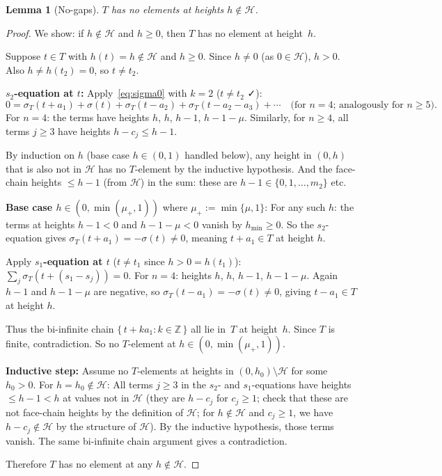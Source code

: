 \documentclass{article}
\newtheorem{lemma}{Lemma}
\begin{document}
\begin{lemma}[No-gaps]\label{lem:nogaps}
$T$ has no elements at heights $h\notin\mathcal{H}$.
\end{lemma}
\begin{proof}
We show: if $h\notin\mathcal{H}$ and $h\ge 0$, then $T$ has no element at height~$h$.

Suppose $t\in T$ with $h(t)=h\notin\mathcal{H}$ and $h\ge 0$.
Since $h\ne 0$ (as $0\in\mathcal{H}$), $h>0$.  Also $h\ne h(t_2)=0$, so $t\ne t_2$.

\textbf{$s_2$-equation at $t$:}
Apply~\eqref{eq:sigma0} with $k=2$ ($t\ne t_2$ ✓):
\[
  0=\sigma_T(t+a_1)+\sigma(t)+\sigma_T(t-a_2)+\sigma_T(t-a_2-a_3)+\cdots
  \quad\text{(for }n=4\text{; analogously for }n\ge 5).
\]
For $n=4$: the terms have heights $h$, $h$, $h-1$, $h-1-\mu$.
Similarly, for $n\ge 4$, all terms $j\ge 3$ have heights $h-c_j\le h-1$.

By induction on $h$ (base case $h\in(0,1)$ handled below), any height in
$(0,h)$ that is also not in $\mathcal{H}$ has no $T$-element by the inductive hypothesis.
And the face-chain heights $\le h-1$ (from $\mathcal{H}$) in the sum: these are
$h-1\in\{0,1,\dots,m_2\}$ etc.

\textbf{Base case $h\in(0,\min(\mu_+,1))$} where $\mu_+:=\min\{\mu,1\}$:
For any such $h$: the terms at heights $h-1<0$ and $h-1-\mu<0$ vanish by
$h_{\min}\ge 0$.  So the $s_2$-equation gives $\sigma_T(t+a_1)=-\sigma(t)\ne 0$,
meaning $t+a_1\in T$ at height $h$.

Apply \textbf{$s_1$-equation at $t$} ($t\ne t_1$ since $h>0=h(t_1)$):
$\sum_j\sigma_T(t+(s_1-s_j))=0$.  For $n=4$: heights $h$, $h$, $h-1$, $h-1-\mu$.
Again $h-1$ and $h-1-\mu$ are negative, so $\sigma_T(t-a_1)=-\sigma(t)\ne 0$,
giving $t-a_1\in T$ at height $h$.

Thus the bi-infinite chain $\{\,t+ka_1:k\in\mathbb{Z}\,\}$ all lie in~$T$ at height~$h$.
Since $T$ is finite, contradiction.  So no $T$-element at $h\in(0,\min(\mu_+,1))$.

\textbf{Inductive step:}  Assume no $T$-elements at heights in $(0,h_0)\setminus\mathcal{H}$
for some $h_0>0$.  For $h=h_0\notin\mathcal{H}$:
All terms $j\ge 3$ in the $s_2$- and $s_1$-equations have heights $\le h-1<h$ at
values not in $\mathcal{H}$ (they are $h-c_j$ for $c_j\ge 1$; check that these are
not face-chain heights by the definition of $\mathcal{H}$; for $h\notin\mathcal{H}$
and $c_j\ge 1$, we have $h-c_j\notin\mathcal{H}$ by the structure of $\mathcal{H}$).
By the inductive hypothesis, those terms vanish.
The same bi-infinite chain argument gives a contradiction.

Therefore $T$ has no element at any $h\notin\mathcal{H}$.
\end{proof}
\end{document}
